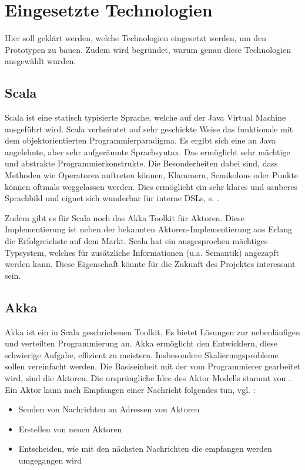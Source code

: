 \section{Eingesetzte Technologien}\label{}
 
Hier soll geklärt werden, welche Technologien eingesetzt werden, um den Prototypen zu bauen. Zudem wird begründet, warum genau diese Technologien ausgewählt wurden.

 
\subsection{Scala}\label{}
 
Scala ist eine statisch typisierte Sprache, welche auf der Java Virtual Machine ausgeführt wird. Scala verheiratet auf sehr geschickte Weise das funktionale mit dem objektorientierten Programmierparadigma. Es ergibt sich eine an Java angelehnte, aber sehr aufgeräumte Sprachsyntax. Das ermöglicht sehr mächtige und abstrakte Programmierkonstrukte. Die Besonderheiten dabei sind, dass Methoden wie Operatoren auftreten können, Klammern, Semikolons oder Punkte können oftmals weggelassen werden. Dies ermöglicht ein sehr klares und sauberes Sprachbild und eignet sich wunderbar für interne DSLs, s. \citep{Hodapp}.

 
Zudem gibt es für Scala noch das Akka Toolkit für Aktoren. Diese Implementierung ist neben der bekannten Aktoren-Implementierung aus Erlang die Erfolgreichste auf dem Markt. Scala hat ein ausgesprochen mächtiges Typsystem, welches für zusätzliche Informationen (u.a. Semantik) angezapft werden kann. Diese Eigenschaft könnte für die Zukunft des Projektes interessant sein.

 
\subsection{Akka}\label{}
 
Akka ist ein in Scala geschriebenen Toolkit. Es bietet Lösungen zur nebenläufigen und verteilten Programmierung an. Akka ermöglicht den Entwicklern, diese schwierige Aufgabe, effizient zu meistern. Insbesondere Skalierungsprobleme sollen vereinfacht werden. Die Basiseinheit mit der vom Programmierer gearbeitet wird, sind die Aktoren. Die ursprüngliche Idee des Aktor Modells stammt von \citep{Hewitt}. Ein Aktor kann nach Empfangen einer Nachricht folgendes tun, vgl. \citep{Hewitt2}:

 
\begin{itemize}

\item Senden von Nachrichten an Adressen von Aktoren
\item Erstellen von neuen Aktoren
\item Entscheiden, wie mit den nächsten Nachrichten die empfangen werden umgegangen wird
\end{itemize}
 
